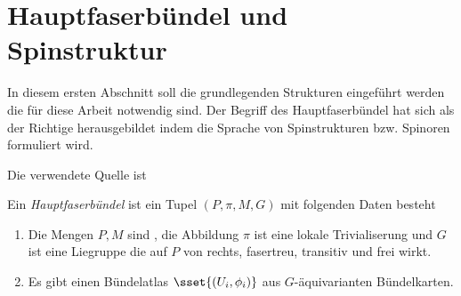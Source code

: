 






%
\section{Hauptfaserbündel und Spinstruktur}

In diesem ersten Abschnitt soll die grundlegenden Strukturen eingeführt 
werden die für diese Arbeit notwendig sind. Der Begriff des Hauptfaserbündel hat sich als der Richtige herausgebildet indem die Sprache von Spinstrukturen bzw. Spinoren formuliert wird.

Die verwendete Quelle ist \cite{baum09}

\begin{Def}[Hauptfaserbündel]
	Ein \textit{Hauptfaserbündel} ist ein Tupel $(P,\pi,M,G)$ mit folgenden Daten besteht
	\begin{enumerate}[1)]
		\item Die Mengen $P,M$ sind \mfgen, die Abbildung $\pi$ ist eine lokale Trivialiserung und $G$ ist eine Liegruppe
		die auf $P$ von rechts, fasertreu, transitiv und frei wirkt.
		\item Es gibt einen Bündelatlas $\sset{(U_i,\phi_i)}$ aus $G$-äquivarianten Bündelkarten. 
	\end{enumerate}		
\end{Def}


